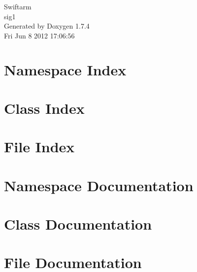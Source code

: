 \documentclass[a4paper]{book}
\begin{document}
\hypersetup{pageanchor=false}
\begin{titlepage}
\vspace*{7cm}
\begin{center}
{\Large Swiftarm \\[1ex]\large sig1 }\\
\vspace*{1cm}
{\large Generated by Doxygen 1.7.4}\\
\vspace*{0.5cm}
{\small Fri Jun 8 2012 17:06:56}\\
\end{center}
\end{titlepage}
\clearemptydoublepage
{}
\tableofcontents
\clearemptydoublepage
{}
\hypersetup{pageanchor=true}
\chapter{Namespace Index}

\chapter{Class Index}

\chapter{File Index}

\chapter{Namespace Documentation}



\chapter{Class Documentation}






\chapter{File Documentation}












\printindex
\end{document}
